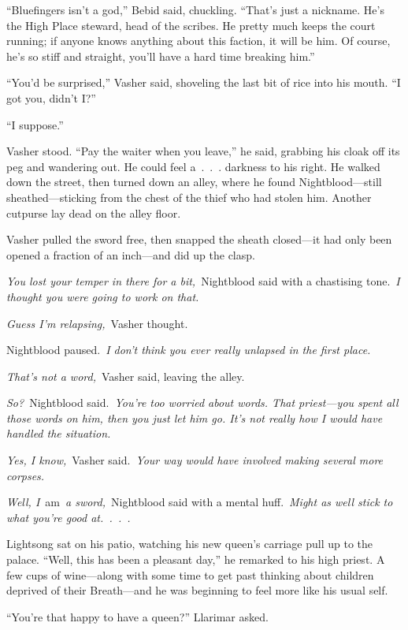 “Bluefingers isn’t a god,” Bebid said, chuckling. “That’s just a nickname. He’s the High Place steward, head of the scribes. He pretty much keeps the court running; if anyone knows anything about this faction, it will be him. Of course, he’s so stiff and straight, you’ll have a hard time breaking him.”

“You’d be surprised,” Vasher said, shoveling the last bit of rice into his mouth. “I got you, didn’t I?”

“I suppose.”

Vasher stood. “Pay the waiter when you leave,” he said, grabbing his cloak off its peg and wandering out. He could feel a~.~.~. darkness to his right. He walked down the street, then turned down an alley, where he found Nightblood—still sheathed—sticking from the chest of the thief who had stolen him. Another cutpurse lay dead on the alley floor.

Vasher pulled the sword free, then snapped the sheath closed—it had only been opened a fraction of an inch—and did up the clasp.

\textit{You lost your temper in there for a bit,}~Nightblood said with a chastising tone.~\textit{I thought you were going to work on that.}

\textit{Guess I’m relapsing,}~Vasher thought.

Nightblood paused.~\textit{I don’t think you ever really unlapsed in the first place.}

\textit{That’s not a word,}~Vasher said, leaving the alley.

\textit{So?}~Nightblood said.~\textit{You’re too worried about words. That priest—you spent all those words on him, then you just let him go. It’s not really how I would have handled the situation.}

\textit{Yes, I know,}~Vasher said.~\textit{Your way would have involved making several more corpses.}

\textit{Well, I}~am~\textit{a sword,}~Nightblood said with a mental huff.~\textit{Might as well stick to what you’re good at.~.~.~.}

\orn

Lightsong sat on his patio, watching his new queen’s carriage pull up to the palace. “Well, this has been a pleasant day,” he remarked to his high priest. A few cups of wine—along with some time to get past thinking about children deprived of their Breath—and he was beginning to feel more like his usual self.

“You’re that happy to have a queen?” Llarimar asked.

